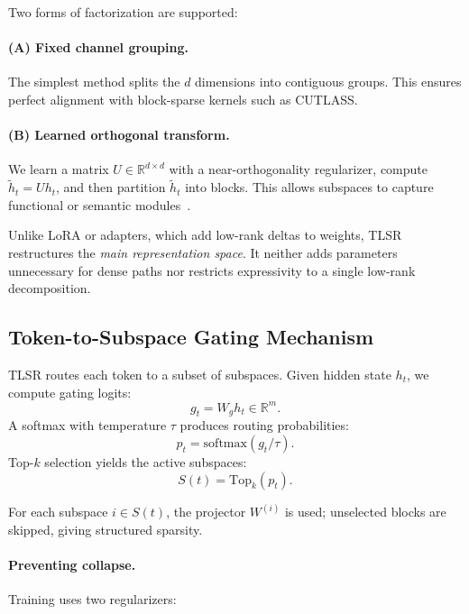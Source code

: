 \documentclass{article}
\theoremstyle{plain}
\theoremstyle{definition}
\theoremstyle{remark}
\begin{document}
Two forms of factorization are supported:

\paragraph{(A) Fixed channel grouping.}
The simplest method splits the $d$ dimensions into contiguous groups.
This ensures perfect alignment with block-sparse kernels such as CUTLASS.

\paragraph{(B) Learned orthogonal transform.}
We learn a matrix $U \in \mathbb{R}^{d \times d}$ with a near-orthogonality
regularizer, compute $\tilde{h}_t = Uh_t$, and then partition $\tilde{h}_t$
into blocks.
This allows subspaces to capture functional or semantic modules~\cite{mickus2022muppet,huang2025ndm}.

Unlike LoRA or adapters, which add low-rank deltas to weights,
TLSR restructures the \emph{main representation space}.
It neither adds parameters unnecessary for dense paths
nor restricts expressivity to a single low-rank decomposition.

\subsection{Token-to-Subspace Gating Mechanism}

TLSR routes each token to a subset of subspaces.
Given hidden state $h_t$, we compute gating logits:
\begin{equation}
g_t = W_g h_t \in \mathbb{R}^m.
\end{equation}
A softmax with temperature $\tau$ produces routing probabilities:
\begin{equation}
p_t = \mathrm{softmax}(g_t / \tau).
\end{equation}
Top-$k$ selection yields the active subspaces:
\begin{equation}
S(t) = \mathrm{Top}_k(p_t).
\end{equation}

For each subspace $i \in S(t)$, the projector $W^{(i)}$ is used;
unselected blocks are skipped, giving structured sparsity.

\paragraph{Preventing collapse.}
Training uses two regularizers:
\end{document}
